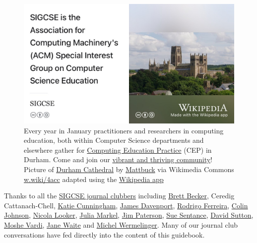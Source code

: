 \documentclass[
]{book}
\begin{document}
\begin{figure}

{\centering \includegraphics[width=0.99\linewidth]{images/sigcse} 

}

\caption{Every year in January practitioners and researchers in computing education, both within Computer Science departments and elsewhere gather for \href{https://cepconference.webspace.durham.ac.uk/}{Computing Education Practice} (CEP) in Durham. Come and join our \href{https://uki-sigcse.acm.org/practice/}{vibrant and thriving community}! Picture of \href{https://en.wikipedia.org/wiki/Durham_Cathedral}{Durham Cathedral} by \href{https://commons.wikimedia.org/wiki/User:Mattbuck}{Mattbuck} via Wikimedia Commons \href{https://w.wiki/4acc}{w.wiki/4acc} adapted using the \href{https://apps.apple.com/us/app/wikipedia/id324715238}{Wikipedia app}}\label{fig:sigcse-fig}
\end{figure}



Thanks to all the \href{https://sigcse.cs.manchester.ac.uk}{SIGCSE journal clubbers} including \href{https://www.brettbecker.com/}{Brett Becker}, Ceredig Cattanach-Chell, \href{https://www.kicunningham.com/}{Katie Cunningham}, \href{https://en.wikipedia.org/wiki/James_H._Davenport}{James Davenport}, \href{https://riceacademy.rice.edu/junior-fellows/dr-rodrigo-ferreira}{Rodrigo Ferreira}, \href{https://www.nottingham.ac.uk/computerscience/people/colin.johnson}{Colin Johnson}, \href{https://www.gla.ac.uk/pgrs/nicolalooker/}{Nicola Looker}, \href{https://juliamarkel.github.io/}{Julia Markel}, \href{https://www.gcu.ac.uk/cebe/staff/jim\%20paterson/}{Jim Paterson}, \href{https://en.wikipedia.org/wiki/Sue_Sentance}{Sue Sentance}, \href{https://www.brookes.ac.uk/templates/pages/staff.aspx?uid=p0073862}{David Sutton}, \href{https://en.wikipedia.org/wiki/Moshe_Vardi}{Moshe Vardi}, \href{http://eecs.qmul.ac.uk/profiles/waitejanelisa.html}{Jane Waite} and \href{https://www.open.ac.uk/people/mw4687}{Michel Wermelinger}. Many of our journal club conversations have fed directly into the content of this guidebook.
\end{document}
